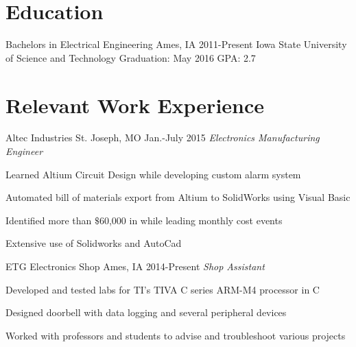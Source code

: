 \documentclass[]{friggeri-cv} %
\begin{document}
\section{Education}
\begin{entrylist}
\entry
{Bachelors in Electrical Engineering}
{Ames, IA}
{2011-Present}
{Iowa State University of Science and Technology}
{Graduation: May 2016 \newline
GPA: 2.7}

\end{entrylist}
\section{Relevant Work Experience}
\begin{entrylist}
\entry
{Altec Industries}
{St. Joseph, MO}
{Jan.-July 2015}
{\emph{Electronics Manufacturing Engineer}}
{\begin{itemizenosep}
	\item Learned Altium Circuit Design while developing custom alarm system 
	\item Automated bill of materials export from Altium to SolidWorks using Visual Basic
	\item Identified more than $\$$60,000 in while leading monthly cost events
	\item Extensive use of Solidworks and AutoCad
\end{itemizenosep}}
\entry
{ETG Electronics Shop}
{Ames, IA}
{2014-Present}
{\emph{Shop Assistant}}
{\begin{itemizenosep}
	\item Developed and tested labs for TI's TIVA C series ARM-M4 processor in C
	\item Designed doorbell with data logging and several peripheral devices 
	\item Worked with professors and students to advise and troubleshoot various projects
\end{itemizenosep}}
\end{entrylist}
\end{document}
